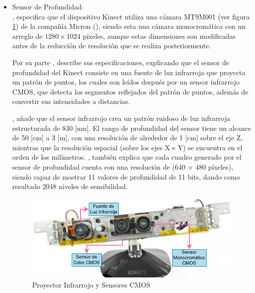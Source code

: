             \begin{itemize}
                \item Sensor de Profundidad: \\
                \cite{kramer_hacking_2012}, especifica que el dispositivo Kinect utiliza una cámara MT9M001 (ver figura \ref{fig:Kinect_Sensors}) de la compañía Micron (\cite*{micron_12-inch_2004}), siendo esta una cámara monocromática con un arreglo de $1280\times1024$ píxeles, aunque estas dimensiones son modificadas antes de la reducción de resolución que se realiza posteriormente.

                Por su parte \cite{davison_kinect_2012}, describe sus especificaciones, explicando que el sensor de profundidad del Kinect consiste en una fuente de luz infrarroja que proyecta un patrón de puntos, los cuales son leídos después por un sensor infrarrojo CMOS, que detecta los segmentos reflejados del patrón de puntos, además de convertir sus intensidades a distancias. 
                

                \cite{kramer_hacking_2012}, añade que el sensor infrarrojo crea un patrón ruidoso de luz infrarroja estructurada de 830 [nm]. El rango de profundidad del sensor tiene un alcance de 50 [cm] a 3 [m], con una resolución de alrededor de 1 [cm] sobre el eje Z, mientras que la resolución espacial (sobre los ejes X e Y) se encuentra en el orden de los milímetros. \cite{davison_kinect_2012}, también explica que cada cuadro generado por el sensor de profundidad cuenta con una resolución de (640 $\times$ 480 píxeles), siendo capaz de mostrar 11 valores de profundidad de 11 bits, dando como resultado 2048 niveles de sensibilidad.

                \begin{figure}[ht]
                    \centering
                    \includegraphics[scale=0.35]{Figures/Kinect_open.png}
                    \caption{Proyector Infrarrojo y Sensores CMOS \cite*{eetimes_inside_2010}}
                    \label{fig:Kinect_Sensors}
                \end{figure}



\end{itemize}
